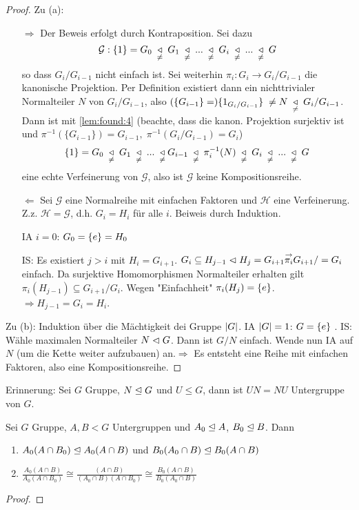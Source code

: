 \documentclass[../main.tex]{subfiles}
\begin{document}
\begin{proof}
    Zu (a): 
    \begin{itemize}
        \item[$\Rightarrow$] Der Beweis erfolgt durch Kontraposition. Sei dazu $$\mathcal{G}: \{1\} = G_0 \; \underset{\neq}{\triangleleft} \; G_1 \; \underset{\neq}{\triangleleft} \; ... \; \underset{\neq}{\triangleleft} \; G_i \; \underset{\neq}{\triangleleft} \; ... \; \underset{\neq}{\triangleleft} \; G$$ so dass $G_i/G_{i-1}$ nicht einfach ist. Sei weiterhin $\pi_i: G_i \rightarrow G_i/G_{i-1}$ die kanonische Projektion. Per Definition existiert dann ein nichttrivialer Normalteiler $N$ von $G_i/G_{i-1}$, also $(\{G_{i-1}\} =) \{1_{G_i/G_{i-1}}\} \; \neq N \; \underset{\neq}{\triangleleft} \; G_i/G_{i-1}$. Dann ist mit \cref{lem:found:4} (beachte, dass die kanon. Projektion surjektiv ist und $\pi^{-1}(\{G_{i-1}\}) = G_{i-1}, \; \pi^{-1}(G_i/G_{i-1}) = G_i$) $$\{1\} = G_0 \; \underset{\neq}{\triangleleft} \; G_1 \; \underset{\neq}{\triangleleft} \; ... \; \underset{\neq}{\triangleleft} G_{i-1} \; \underset{\neq}{\triangleleft} \; \pi_i^{-1}(N) \; \underset{\neq}{\triangleleft} \; G_i \; \underset{\neq}{\triangleleft} \; ... \; \underset{\neq}{\triangleleft} \; G$$ eine echte Verfeinerung von $\mathcal{G}$, also ist $\mathcal{G}$ keine Kompositionsreihe.
        \item[$\Leftarrow$] Sei $\mathcal{G}$ eine Normalreihe mit einfachen Faktoren und $\mathcal{H}$ eine Verfeinerung. Z.z. $\mathcal{H} = \mathcal{G}$, d.h. $G_i = H_i$ für alle $i$. Beiweis durch Induktion.

        IA  $i=0$: $G_0=\{e\}=H_0$ \checkmark

        IS: Es existiert $j>i$ mit $H_i = G_{i+1}$. $G_i \subseteq H_{j-1}\vartriangleleft H_j = G_{i+1} \overset{\rightarrow}{\pi_i} G_{i+1}/=G_i$ einfach. Da surjektive Homomorphismen Normalteiler erhalten gilt $\pi_i(H_{j-1})\subseteq G_{i+1}/G_i$. Wegen "Einfachheit" $\pi_i(H_j)=\{e\}$. $\Rightarrow H_{j-1} = G_i = H_i$.
    \end{itemize}
    Zu (b):
    Induktion über die Mächtigkeit dei Gruppe $\left\vert G \right\vert$. IA $\left\vert G \right\vert=1$: $G=\{e\}$ \checkmark.
    IS: Wähle maximalen Normalteiler $N\vartriangleleft G$. Dann ist $G/N$ einfach. Wende nun IA auf $N$ (um die Kette weiter aufzubauen) an.$\Rightarrow$ Es entsteht eine Reihe mit einfachen Faktoren, also eine Kompositionsreihe.
\end{proof}

Erinnerung: Sei $G$ Gruppe, $N \trianglelefteq G$ und $U\leq G$, dann ist $UN=NU$ Untergruppe von $G$. 
\begin{lemma}
Sei $G$ Gruppe, $A,B <G$ Untergruppen und $A_0 \trianglelefteq A$, $B_0 \trianglelefteq B$. Dann
\begin{enumerate}[label=(\alph*)]
        \item $A_0(A\cap B_0)\trianglelefteq A_0(A\cap B)$ und $B_0(A_0 \cap B) \trianglelefteq B_0(A\cap B)$
        \item $\frac{A_0(A\cap B)}{A_0(A\cap B_0)}\cong\frac{(A\cap B)}{(A_0\cap B)(A\cap B_0)}\cong \frac{B_0(A\cap B)}{B_0(A_0\cap B)}$
    \end{enumerate}
\end{lemma}
\begin{proof}
    \TODO
\end{proof}
\end{document}
